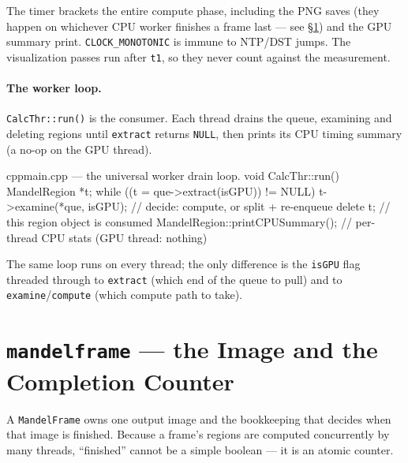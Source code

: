 \documentclass[
	english,
	letterpaper, oneside
]{article}
\begin{document}
The timer brackets the entire compute phase, including the PNG saves (they happen
on whichever CPU worker finishes a frame last --- see \S\ref{sec:frame}) and the
GPU summary print. \texttt{CLOCK\_MONOTONIC} is immune to NTP/DST jumps. The
visualization passes run after \texttt{t1}, so they never count against the
measurement.

\paragraph{The worker loop.} \texttt{CalcThr::run()} is the consumer. Each thread
drains the queue, examining and deleting regions until \texttt{extract} returns
\texttt{NULL}, then prints its CPU timing summary (a no-op on the GPU thread).

\begin{sourcecode}{cpp}{main.cpp --- the universal worker drain loop.}
void CalcThr::run() {
    MandelRegion *t;
    while ((t = que->extract(isGPU)) != NULL) {
        t->examine(*que, isGPU);     // decide: compute, or split + re-enqueue
        delete t;                    // this region object is consumed
    }
    MandelRegion::printCPUSummary(); // per-thread CPU stats (GPU thread: nothing)
}
\end{sourcecode}

The same loop runs on every thread; the only difference is the \texttt{isGPU} flag
threaded through to \texttt{extract} (which end of the queue to pull) and to
\texttt{examine}/\texttt{compute} (which compute path to take).

\section{\texttt{mandelframe} --- the Image and the Completion Counter}
\label{sec:frame}

A \texttt{MandelFrame} owns one output image and the bookkeeping that decides when
that image is finished. Because a frame's regions are computed concurrently by
many threads, ``finished'' cannot be a simple boolean --- it is an atomic counter.
\end{document}
